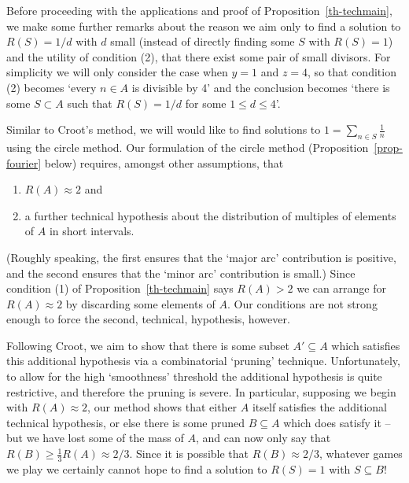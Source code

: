 \documentclass{amsart}
\begin{document}
Before proceeding with the applications and proof of Proposition~\ref{th-techmain}, we make some further remarks about the reason we aim only to find a solution to $R(S)=1/d$ with $d$ small (instead of directly finding some $S$ with $R(S)=1$) and the utility of condition (2), that there exist some pair of small divisors. For simplicity we will only consider the case when $y=1$ and $z=4$, so that condition (2) becomes `every $n\in A$ is divisible by 4' and the conclusion becomes `there is some $S\subset A$ such that $R(S)=1/d$ for some $1\leq d\leq 4$'. 

Similar to Croot's method, we will would like to find solutions to $1=\sum_{n\in S}\frac{1}{n}$ using the circle method. Our formulation of the circle method (Proposition~\ref{prop-fourier} below) requires, amongst other assumptions, that
\begin{enumerate}
\item $R(A)\approx 2$ and
\item a further technical hypothesis about the distribution of multiples of elements of $A$ in short intervals.
\end{enumerate}
(Roughly speaking, the first ensures that the `major arc' contribution is positive, and the second ensures that the `minor arc' contribution is small.) Since condition (1) of Proposition~\ref{th-techmain} says $R(A)>2$ we can arrange for $R(A)\approx 2$ by discarding some elements of $A$. Our conditions are not strong enough to force the second, technical, hypothesis, however.

Following Croot, we aim to show that there is some subset $A'\subseteq A$ which satisfies this additional hypothesis via a combinatorial `pruning' technique. Unfortunately, to allow for the high `smoothness' threshold the additional hypothesis is quite restrictive, and therefore the pruning is severe. In particular, supposing we begin with $R(A)\approx 2$, our method shows that either $A$ itself satisfies the additional technical hypothesis, or else there is some pruned $B\subseteq A$ which does satisfy it -- but we have lost some of the mass of $A$, and can now only say that $R(B)\geq \frac{1}{3}R(A)\approx 2/3$. Since it is possible that $R(B)\approx 2/3$, whatever games we play we certainly cannot hope to find a solution to $R(S)=1$ with $S\subseteq B$! 
\end{document}
